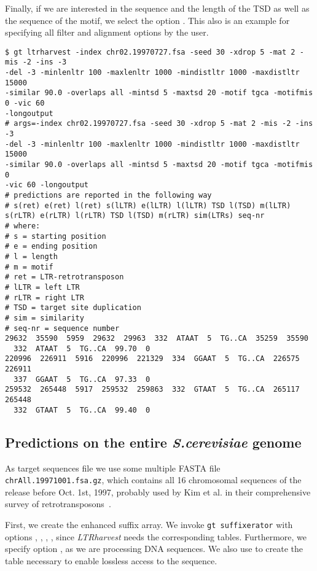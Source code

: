 \documentclass[12pt,titlepage]{article}
\newcommand{\LTRharvest}{\textit{LTRharvest}\xspace}
\newcommand{\Gtsuffixerator}{\texttt{gt suffixerator}\xspace}
\begin{document}
Finally, if we are interested in the sequence and the length of the TSD
as well as the sequence of the motif, we select the option
.
This also is an example for specifying all filter and alignment
options by the user.

\begin{footnotesize}
\begin{verbatim}
$ gt ltrharvest -index chr02.19970727.fsa -seed 30 -xdrop 5 -mat 2 -mis -2 -ins -3
-del -3 -minlenltr 100 -maxlenltr 1000 -mindistltr 1000 -maxdistltr 15000
-similar 90.0 -overlaps all -mintsd 5 -maxtsd 20 -motif tgca -motifmis 0 -vic 60
-longoutput
# args=-index chr02.19970727.fsa -seed 30 -xdrop 5 -mat 2 -mis -2 -ins -3
-del -3 -minlenltr 100 -maxlenltr 1000 -mindistltr 1000 -maxdistltr 15000
-similar 90.0 -overlaps all -mintsd 5 -maxtsd 20 -motif tgca -motifmis 0
-vic 60 -longoutput
# predictions are reported in the following way
# s(ret) e(ret) l(ret) s(lLTR) e(lLTR) l(lLTR) TSD l(TSD) m(lLTR) s(rLTR) e(rLTR) l(rLTR) TSD l(TSD) m(rLTR) sim(LTRs) seq-nr
# where:
# s = starting position
# e = ending position
# l = length
# m = motif
# ret = LTR-retrotransposon
# lLTR = left LTR
# rLTR = right LTR
# TSD = target site duplication
# sim = similarity
# seq-nr = sequence number
29632  35590  5959  29632  29963  332  ATAAT  5  TG..CA  35259  35590
  332  ATAAT  5  TG..CA  99.70  0
220996  226911  5916  220996  221329  334  GGAAT  5  TG..CA  226575  226911
  337  GGAAT  5  TG..CA  97.33  0
259532  265448  5917  259532  259863  332  GTAAT  5  TG..CA  265117  265448
  332  GTAAT  5  TG..CA  99.40  0
\end{verbatim}
\end{footnotesize}

\subsection{Predictions on the entire \textit{S.cerevisiae} genome}
\label{Example-genome}

As target sequences file we use some multiple FASTA file
\texttt{\small{chrAll.19971001.fsa.gz}}, which contains all 16
chromosomal sequences of the release before Oct. 1st, 1997, probably
used by Kim et al.
in their comprehensive survey of retrotransposons~\cite{kim:1998}.

First, we create the enhanced suffix array. We invoke \Gtsuffixerator with
options , , , ,
since \LTRharvest needs the corresponding tables. Furthermore, we specify option
, as we are processing DNA sequences. We also use
 to create the table necessary to enable lossless access to
the sequence.
\end{document}
